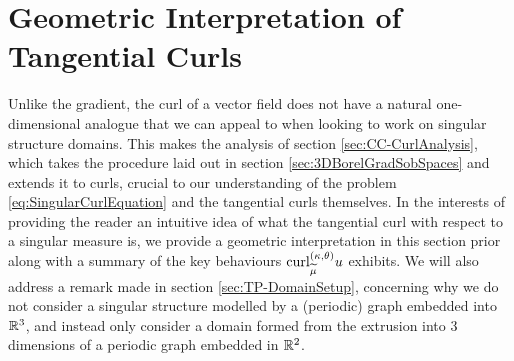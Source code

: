 \section{Geometric Interpretation of Tangential Curls} \label{sec:CC-Geometric}
Unlike the gradient, the curl of a vector field does not have a natural one-dimensional analogue that we can appeal to when looking to work on singular structure domains.
This makes the analysis of section \ref{sec:CC-CurlAnalysis}, which takes the procedure laid out in section \ref{sec:3DBorelGradSobSpaces} and extends it to curls, crucial to our understanding of the problem \eqref{eq:SingularCurlEquation} and the tangential curls themselves.
In the interests of providing the reader an intuitive idea of what the tangential curl with respect to a singular measure is, we provide a geometric interpretation in this section prior along with a summary of the key behaviours $\mathrm{curl}_{\widetilde{\mu}}^{\left( \kappa, \theta \right)}u$ exhibits.
We will also address a remark made in section \ref{sec:TP-DomainSetup}, concerning why we do not consider a singular structure modelled by a (periodic) graph embedded into $\mathbb{R}^3$, and instead only consider a domain formed from the extrusion into 3 dimensions of a periodic graph embedded in $\mathbb{R}^2$.

